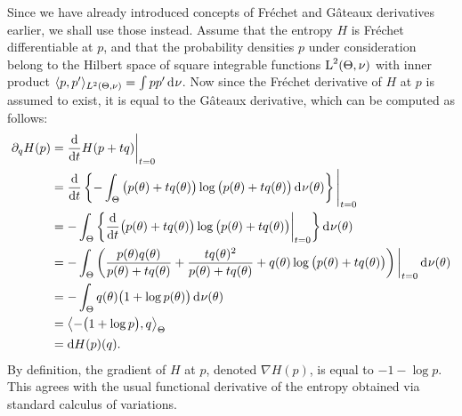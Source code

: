 Since we have already introduced concepts of Fréchet and Gâteaux derivatives earlier, we shall use those instead.
Assume that the entropy $H$ is Fréchet differentiable at $p$, and that the probability densities $p$ under consideration belong to the Hilbert space of square integrable functions $\text{L}^2(\Theta,\nu)$ with inner product $\langle p,p'\rangle_{L^2(\Theta,\nu)} = \int pp' \operatorname{d}\hspace{0.5pt}\!\nu$.
Now since the Fréchet derivative of $H$ at $p$ is assumed to exist, it is equal to the Gâteaux derivative, which can be computed as follows:
\begin{align*}
  \partial_q H(p) 
  &= \frac{\text{d}}{\text{d} t} H(p + tq)  \bigg|_{t=0} \\
  &= \frac{\text{d}}{\text{d} t} \left\{ - \int_\Theta \big(p(\theta) + tq(\theta)\big) \log \big(p(\theta) + tq(\theta)\big) \operatorname{d}\hspace{0.5pt}\!\nu(\theta) \right\} \Bigg|_{t=0} \\
  &= - \int_\Theta \left\{ \frac{\text{d}}{\text{d} t} \big(p(\theta) + tq(\theta)\big) \log \big(p(\theta) + tq(\theta)\big) \bigg|_{t=0} \right\} \operatorname{d}\hspace{0.5pt}\!\nu(\theta)  \\
  &= -\int_\Theta \left( 
    \frac{p(\theta)q(\theta)}{p(\theta)+tq(\theta)}
    + \frac{tq(\theta)^2}{p(\theta) + tq(\theta)}
    + q(\theta)\log\big( p(\theta) + tq(\theta) \big)
    \right)\bigg|_{t=0} \operatorname{d}\hspace{0.5pt}\!\nu(\theta) \\
  &= -\int_\Theta q(\theta)\big(1 + \log p(\theta) \big) \operatorname{d}\hspace{0.5pt}\!\nu(\theta) \\
  &= \left\langle -\big( 1 + \log p \big), q \right\rangle_\Theta \\
  &= \text{d} H(p)(q).   
\end{align*}
By definition, the gradient of $H$ at $p$, denoted $\nabla H(p)$, is equal to $- 1 - \log p$.
This agrees with the usual functional derivative of the entropy obtained via standard calculus of variations.
